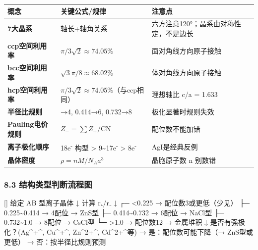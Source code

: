 \documentclass[a4paper,11pt]{ctexart}
\newenvironment{Shaded}{}{}
\newenvironment{Highlighting}{}{}
\newcommand{\NormalTok}[1]{#1}
\newcounter{none}
\begin{document}
{\def\LTcaptype{none} %
\begin{longtable}[]{@{}
  >{\raggedright\arraybackslash}p{}
  >{\raggedright\arraybackslash}p{}
  >{\raggedright\arraybackslash}p{}@{}}
\toprule\noalign{}
\begin{minipage}[b]{\linewidth}\raggedright
概念
\end{minipage} & \begin{minipage}[b]{\linewidth}\raggedright
关键公式/规律
\end{minipage} & \begin{minipage}[b]{\linewidth}\raggedright
注意点
\end{minipage} \\
\midrule\noalign{}
\endhead
\bottomrule\noalign{}
\endlastfoot
\textbf{7大晶系} & 轴长+轴角关系 & 六方注意120°；晶系由对称性定，不是边长 \\
\textbf{ccp空间利用率} & \(\pi/3\sqrt{2} \approx 74.05\%\) & 面对角线方向原子接触 \\
\textbf{bcc空间利用率} & \(\sqrt{3}\pi/8 \approx 68.02\%\) & 体对角线方向原子接触 \\
\textbf{hcp空间利用率} & \(\pi/3\sqrt{2} \approx 74.05\%\)（与ccp相同） & 理想轴比 c/a = 1.633 \\
\textbf{半径比规则} & 0.225→4, 0.414→6, 0.732→8 & 极化显著时规则失效 \\
\textbf{Pauling电价规则} & \(Z_- = \sum Z_+/ \text{CN}\) & 配位数不能加错 \\
\textbf{离子极化顺序} & 18e\textsuperscript{-} 构型 \textgreater{} 9\textasciitilde17e\textsuperscript{-} \textgreater{} 8e\textsuperscript{-} & AgI是经典反例 \\
\textbf{晶体密度} & \(\rho = nM/N_A a^3\) & 晶胞原子数 n 别数错 \\
\end{longtable}
}

\subsubsection{8.3 结构类型判断流程图}\label{ux7ed3ux6784ux7c7bux578bux5224ux65adux6d41ux7a0bux56fe}

\begin{Shaded}
\begin{Highlighting}[]
\NormalTok{给定 AB 型离子晶体}
\NormalTok{   ↓}
\NormalTok{计算 r₊/r₋}
\NormalTok{   ↓}
\NormalTok{┌─ \textless{}0.225 → 配位数3或更低（少见）}
\NormalTok{├─ 0.225\textasciitilde{}0.414 → 4配位 → ZnS型}
\NormalTok{├─ 0.414\textasciitilde{}0.732 → 6配位 → NaCl型}
\NormalTok{├─ 0.732\textasciitilde{}1.0 → 8配位 → CsCl型}
\NormalTok{└─ \textgreater{}1.0 → 配位数12 → 金属堆积}
\NormalTok{   ↓}
\NormalTok{是否有强极化？(Ag\^{}+\^{}, Cu\^{}+\^{}, Zn\^{}2+\^{}, Cd\^{}2+\^{}等)}
\NormalTok{  → 是：配位数可能下降（→ ZnS型或更低）}
\NormalTok{  → 否：按半径比规则预测}
\end{Highlighting}
\end{Shaded}
\end{document}
